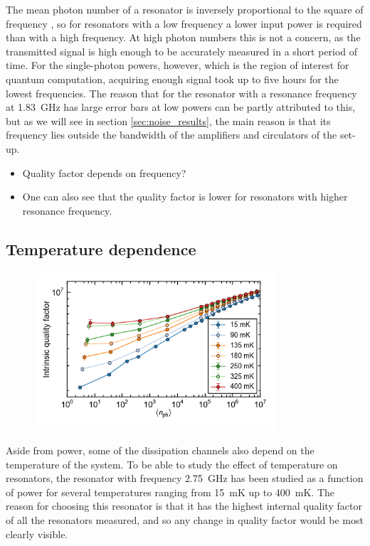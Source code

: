 \documentclass[12pt]{report}
\begin{document}
The mean photon number of a resonator is inversely proportional to the square of frequency \cite{DRIE}, so for resonators with a low frequency a lower input power is required than with a high frequency. At high photon numbers this is not a concern, as the transmitted signal is high enough to be accurately measured in a short period of time. For the single-photon powers, however, which is the region of interest for quantum computation, acquiring enough signal took up to five hours for the lowest frequencies. The reason that for the resonator with a resonance frequency at \SI{1.83}{\giga \hertz} has large error bars at low powers can be partly attributed to this, but as we will see in section \ref{sec:noise_results}, the main reason is that its frequency lies outside the bandwidth of the amplifiers and circulators of the set-up.

\begin{itemize}
    \item Quality factor depends on frequency?
    \item One can also see that the quality factor is lower for resonators with higher resonance frequency.
\end{itemize}




\subsection{Temperature dependence}
\label{sec:resonator:results:emperature_dependence}
\begin{figure}
    \centering
    \label{fig:Qi_vs_n_photon_temperature_dependence}
    \includegraphics[width=0.8\textwidth]{Figures/Qi_vs_n_photon_temperature_dependence.png}
\end{figure}

Aside from power, some of the dissipation channels also depend on the temperature of the system. To be able to study the effect of temperature on resonators, the resonator with frequency \SI{2.75}{\giga \hertz} has been studied as a function of power for several temperatures ranging from \SI{15}{\milli \kelvin} up to \SI{400}{\milli \kelvin}. The reason for choosing this resonator is that it has the highest internal quality factor of all the resonators measured, and so any change in quality factor would be most clearly visible.
\end{document}
